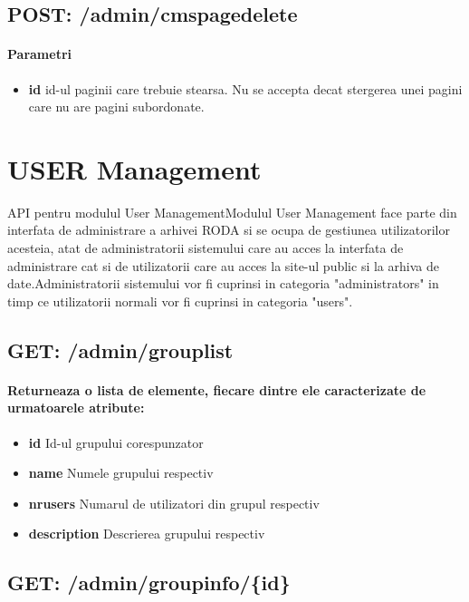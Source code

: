  \subsection*{POST: /admin/cmspagedelete}

\paragraph{Parametri}
\begin{itemize}
\item \textbf{id}
 id-ul paginii care trebuie stearsa. Nu se accepta decat stergerea unei pagini care nu are pagini subordonate.
 \end{itemize}
 

\section{USER Management}

API pentru modulul User ManagementModulul User Management face parte din interfata de administrare a arhivei RODA si se ocupa de gestiunea utilizatorilor acesteia, atat de administratorii sistemului care au acces la interfata de administrare cat si de utilizatorii care au acces la site-ul public si la arhiva de date.Administratorii sistemului vor fi cuprinsi in categoria "administrators" in timp ce utilizatorii normali vor fi cuprinsi in categoria "users". \subsection*{GET: /admin/grouplist}

\paragraph{Returneaza o lista de elemente, fiecare dintre ele caracterizate de urmatoarele atribute:}
\begin{itemize}
\item \textbf{id}
 Id-ul grupului corespunzator
\item \textbf{name}
 Numele grupului respectiv
\item \textbf{nrusers}
 Numarul de utilizatori din grupul respectiv
\item \textbf{description}
 Descrierea grupului respectiv
 \end{itemize}
 \subsection*{GET: /admin/groupinfo/\{id\}}

